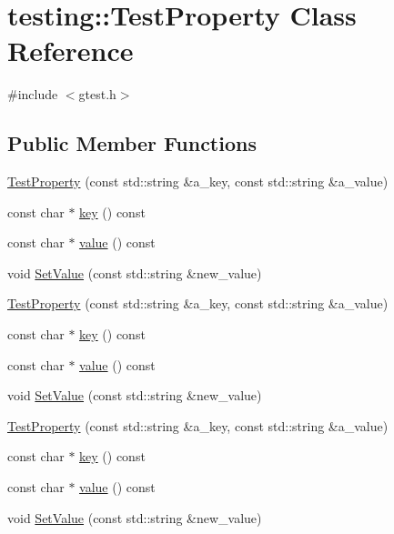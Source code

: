 \hypertarget{classtesting_1_1_test_property}{}\section{testing\+::Test\+Property Class Reference}
\label{classtesting_1_1_test_property}


{\ttfamily \#include $<$gtest.\+h$>$}

\subsection*{Public Member Functions}
\begin{DoxyCompactItemize}
\item 
\mbox{\hyperlink{classtesting_1_1_test_property_a25a0ccf1c75a92af46a48d3c2a873e6d}{Test\+Property}} (const std\+::string \&a\+\_\+key, const std\+::string \&a\+\_\+value)
\item 
const char $\ast$ \mbox{\hyperlink{classtesting_1_1_test_property_ad60435d4ad04ac030487d8998fc61c5f}{key}} () const
\item 
const char $\ast$ \mbox{\hyperlink{classtesting_1_1_test_property_ad423a07af33c88b0c9ed33ee74815a63}{value}} () const
\item 
void \mbox{\hyperlink{classtesting_1_1_test_property_a377245335d9f614cd06d1650e3358e1d}{Set\+Value}} (const std\+::string \&new\+\_\+value)
\item 
\mbox{\hyperlink{classtesting_1_1_test_property_a25a0ccf1c75a92af46a48d3c2a873e6d}{Test\+Property}} (const std\+::string \&a\+\_\+key, const std\+::string \&a\+\_\+value)
\item 
const char $\ast$ \mbox{\hyperlink{classtesting_1_1_test_property_ad60435d4ad04ac030487d8998fc61c5f}{key}} () const
\item 
const char $\ast$ \mbox{\hyperlink{classtesting_1_1_test_property_ad423a07af33c88b0c9ed33ee74815a63}{value}} () const
\item 
void \mbox{\hyperlink{classtesting_1_1_test_property_a377245335d9f614cd06d1650e3358e1d}{Set\+Value}} (const std\+::string \&new\+\_\+value)
\item 
\mbox{\hyperlink{classtesting_1_1_test_property_a25a0ccf1c75a92af46a48d3c2a873e6d}{Test\+Property}} (const std\+::string \&a\+\_\+key, const std\+::string \&a\+\_\+value)
\item 
const char $\ast$ \mbox{\hyperlink{classtesting_1_1_test_property_ad60435d4ad04ac030487d8998fc61c5f}{key}} () const
\item 
const char $\ast$ \mbox{\hyperlink{classtesting_1_1_test_property_ad423a07af33c88b0c9ed33ee74815a63}{value}} () const
\item 
void \mbox{\hyperlink{classtesting_1_1_test_property_a377245335d9f614cd06d1650e3358e1d}{Set\+Value}} (const std\+::string \&new\+\_\+value)
\end{DoxyCompactItemize}
